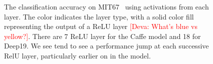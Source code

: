 \documentclass[10pt,twocolumn,letterpaper]{article}
\newcommand{\deva}[1]{\textcolor{red}{[Deva: #1]}}
\begin{document}
\begin{figure}[htbp]
\centering
\caption{The classification accuracy on MIT67~\cite{MIT67} using activations from each layer. The color indicates the layer type, with a solid color fill representing the output of a ReLU layer \deva{What's blue vs yellow?}. There are 7 ReLU layer for the Caffe model and 18 for Deep19. We see tend to see a performance jump at each successive RelU layer, particularly earlier on in the model.}
\label{fig:layer_MIT67}
\end{figure}


%
\end{document}
